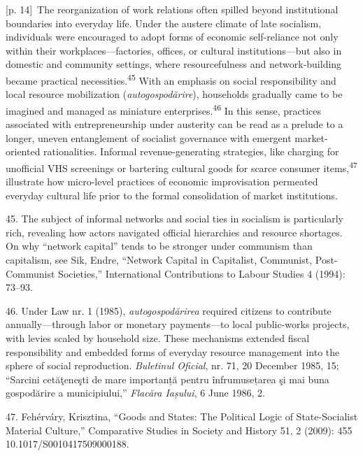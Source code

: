 \documentclass[10pt,a4paper]{article}
\begin{document}
{\scriptsize\color{gray} [p. 14]}\ The reorganization of work relations often spilled beyond institutional boundaries into everyday life. Under the austere climate of late socialism, individuals were encouraged to adopt forms of economic self-reliance not only within their workplaces—factories, offices, or cultural institutions—but also in domestic and community settings, where resourcefulness and network-building became practical necessities.\nobreak\textsuperscript{45} With an emphasis on social responsibility and local resource mobilization (\textit{autogospodărire}), households gradually came to be imagined and managed as miniature enterprises.\nobreak\textsuperscript{46} In this sense, practices associated with entrepreneurship under austerity can be read as a prelude to a longer, uneven entanglement of socialist governance with emergent market-oriented rationalities. Informal revenue-generating strategies, like charging for unofficial VHS screenings or bartering cultural goods for scarce consumer items,\nobreak\textsuperscript{47} illustrate how micro-level practices of economic improvisation permeated everyday cultural life prior to the formal consolidation of market institutions.\par{\small 45. The subject of informal networks and social ties in socialism is particularly rich, revealing how actors navigated official hierarchies and resource shortages. On why “network capital” tends to be stronger under communism than capitalism, see Sik, Endre, “Network Capital in Capitalist, Communist, Post-Communist Societies,” International Contributions to Labour Studies 4 (1994): 73–93.\par}{\small 46. Under Law nr. 1 (1985), \textit{autogospodărirea} required citizens to contribute annually—through labor or monetary payments—to local public-works projects, with levies scaled by household size. These mechanisms extended fiscal responsibility and embedded forms of everyday resource management into the sphere of social reproduction. \textit{Buletinul Oficial}, nr. 71, 20 December 1985, 15; “Sarcini cetăţeneşti de mare importanță pentru înfrumusețarea şi mai buna gospodărire a municipiului,” \textit{Flacăra Iașului}, 6 June 1986, 2.\par}{\small 47. Fehérváry, Krisztina, “Goods and States: The Political Logic of State-Socialist Material Culture,” Comparative Studies in Society and History 51, 2 (2009): 455 10.1017/S0010417509000188.\par}
\end{document}
